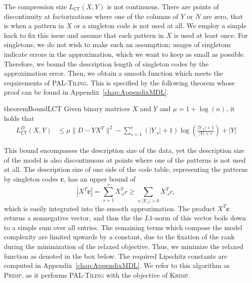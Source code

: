 The compression size $L_{\mathsf{CT}}(X,Y)$ is not continuous. There are points of discontinuity at factorizations where one of the columns of $Y$ or $N$ are zero, that is when a pattern in $X$ or a singleton code is not used at all. We employ a simple hack to fix this issue and assume that each pattern in $X$ is used at least once. For singletons, we do not wish to make such an assumption; usages of singletons indicate errors in the approximation, which we want to keep as small as possible. Therefore, we bound the description length of singleton codes by the approximation error. Then, we obtain a smooth function which meets the requirements of \textsc{PAL-Tiling}. This is specified by the following theorem whose proof can be found in Appendix~\ref{chap:AppendixMDL}. 
\begin{restatable}{theorem}{BoundLCT}\label{thm:bound}
Given binary matrices $X$ and $Y$ and $\mu = 1+\log(n)$, it holds that 
\begin{align} \label{eq:approxLN}
		L^D_{\mathsf{CT}}(X,Y) &\leq \mu \|D-YX^T\|^2-\sum_{s=1}^r(|Y_{\cdot s}|+1)\log\left(\frac{|Y_{\cdot s}|+1}{|Y|+r}\right)+|Y|
\end{align} 
\end{restatable}
This bound encompasses the description size of the data, yet the description size of the model is also discontinuous at points where one of the patterns is not used at all. The description size of one side of the code table, representing the patterns by singleton codes $\mathbf{c}$, has an upper bound of 
\[|X^T\mathbf{c}|=\sum_{s=1}^rX_{\cdot s}^Tc\geq\sum_{s:|Y_{\cdot s}|>0}X_{\cdot s}^Tc,\] 
which is easily integrated into the smooth approximation. The product $X^T\mathbf{c}$ returns a nonnegative vector, and thus the the $L1$-norm of this vector boils down to a simple sum over all entries. 
The remaining terms which compose the model complexity are limited upwards by a constant, due to the fixation of the rank during the minimization of the relaxed objective.
Thus, we minimize the relaxed function as denoted in the box below. 
The required Lipschitz constants are computed in Appendix~\ref{chap:AppendixMDL}. We refer to this algorithm as \textsc{Primp}, as it performs \textsc{PAL-Tiling} with the objective of \textsc{Krimp}.   

